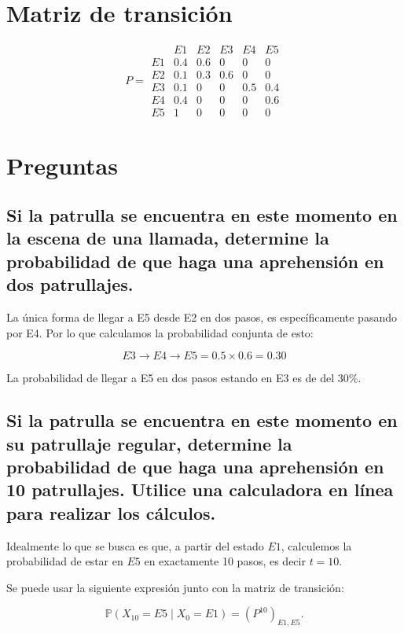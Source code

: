 \documentclass{article}
\begin{document}
\section*{Matriz de transición}
\[
	P =
	\begin{array}{c|ccccc}
		   & E1  & E2  & E3  & E4  & E5  \\
		\hline
		E1 & 0.4 & 0.6 & 0   & 0   & 0   \\
		E2 & 0.1 & 0.3 & 0.6 & 0   & 0   \\
		E3 & 0.1 & 0   & 0   & 0.5 & 0.4 \\
		E4 & 0.4 & 0   & 0   & 0   & 0.6 \\
		E5 & 1   & 0   & 0   & 0   & 0
	\end{array}
\]

\section*{Preguntas}

\subsection*{Si la patrulla se encuentra en este momento en la escena de una llamada, determine la probabilidad de que haga una aprehensión en dos patrullajes.}

La única forma de llegar a E5 desde E2 en dos pasos, es específicamente pasando por E4.
Por lo que calculamos la probabilidad conjunta de esto:

$$
	E3 \rightarrow E4 \rightarrow E5 = 0.5 \times 0.6 = 0.30
$$

La probabilidad de llegar a E5 en dos pasos estando en E3 es de del 30\%.

\subsection*{Si la patrulla se encuentra en este momento en su patrullaje regular, determine la probabilidad de que haga una aprehensión en 10 patrullajes. Utilice una calculadora en línea para realizar los cálculos.}

Idealmente lo que se busca es que, a partir del estado $E1$, calculemos la probabilidad de estar en $E5$ en exactamente 10 pasos, es decir $t=10$.

Se puede usar la siguiente expresión junto con la matriz de transición:

$$
	\mathbb{P}(X_{10}=E5 \mid X_0=E1) = (P^{10})_{E1,E5}.
$$
\end{document}
